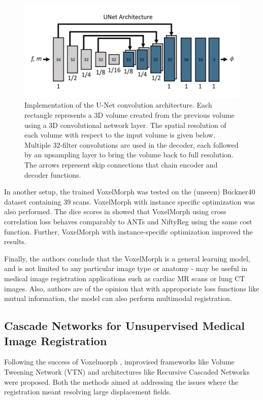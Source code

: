 \documentclass{report}
\begin{document}
	\begin{figure}[h]
		\centering
		\includegraphics[width=0.8\columnwidth]{resources/chapter2/vxm_unet.png}
		\caption{Implementation of the U-Net convolution architecture. Each rectangle represents a 3D volume created from the previous volume using a 3D convolutional network layer. The spatial resolution of each volume with respect to the input volume is given below. Multiple 32-filter convolutions are used in the decoder, each followed by an upsampling layer to bring the volume back to full resolution. The arrows represent skip connections that chain encoder and decoder functions. \cite{Balakrishnan_2019}}
		\label{fig:vxm_unet}
	\end{figure}
	
	In another setup, the trained VoxelMorph was tested on the (unseen) Buckner40 dataset containing 39 scans. VoxelMorph with instance specific optimization was also performed. The dice scores in showed that VoxelMorph using cross correlation loss behaves comparably to ANTs and NiftyReg using the same cost function. Further, VoxelMorph with instance-specific optimization improved the results.
	
	Finally, the authors conclude that the VoxelMorph is a general learning model, and is not limited to any particular image type or anatomy - may be useful in medical image registration applications such as cardiac MR scans or lung CT images. Also, authors are of the opinion that with approporiate loss functions like mutual information, the model can also perform multimodal registration.
	
	\subsection{Cascade Networks for Unsupervised Medical Image Registration}
	Following the success of Voxelmorph \cite{Balakrishnan_2019}, improvised frameworks like Volume Tweening Network (VTN) \cite{8889674} and architectures like Recursive Cascaded Networks \cite{Zhao_2019} were proposed. Both the methods aimed at addressing the issues where the registration meant resolving large displacement fields.
	
\end{document}
